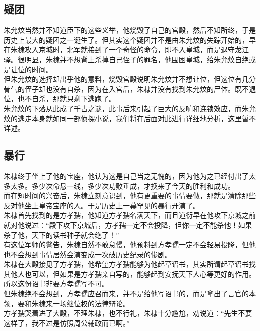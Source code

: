 \begin{multicols}{\theparacolNo}
\subsection{疑团}
朱允炆当然并不知道臣下的这些义举，他烧毁了自己的宫殿，然后不知所终，于是历史上最大的疑团之一诞生了。但其实这个疑团并不是由朱允炆的失踪开始的，早在朱棣攻入京城时，北军就接到了一个奇怪的命令，即不入皇城，而是退守龙江驿。很明显，朱棣并不想背上杀掉自己侄子的罪名，他围困皇城，给朱允炆自绝或是让位的时间。\\

但朱允炆的选择却出乎他的意料，烧毁宫殿说明朱允炆并不想让位，但这位有几分骨气的侄子却也没有自杀，因为在入宫后，朱棣并没有找到朱允炆的尸体。既不退位，也不自杀，那就只剩下逃跑了。\\

朱允炆的下落从此成了千古之谜，此事后来引起了巨大的反响和连锁效应，而朱允炆的逃走本身就如同一部侦探小说，我们将在后面对此进行详细地分析，这里暂不详述。\\

\subsection{暴行}
朱棣终于坐上了他的宝座，他认为这是自己当之无愧的，因为他为之已经付出了太多太多。多少次命悬一线，多少次功败垂成，才换来了今天的胜利和成功。\\

而在短时间的兴奋后，朱棣立刻意识到，他有更重要的事情要做，那就是清除那些反对他坐上皇帝宝座的人。于是历史上一幕罕见的暴行开演了。\\

朱棣首先找到的是方孝孺，他知道方孝孺名满天下，而且道衍早在他攻下京城之前就对他说过：“殿下攻下京城后，方孝孺一定不会投降，但你一定不能杀他！如果杀了他，天下的读书种子就会绝了！”\\

有这位军师的警告，朱棣自然不敢怠慢，他预料到方孝孺一定不会轻易投降，但他也不会想到事情居然会演变成一次破历史纪录的惨剧。\\

朱棣在大殿接见了方孝孺，他希望方孝孺能够为他起草诏书，其实所谓起草诏书找其他人也可以，但如果是方孝孺亲自写的，能够起到安抚天下人心等更好的作用。所以这份诏书非要方孝孺写不可。\\

但朱棣绝不会想到，方孝孺应召而来，并不是给他写诏书的，而是拿出了言官的本领，要和朱棣来一场继位权的法律辩论。\\

方孝孺哭着进了大殿，不理朱棣，也不行礼，朱棣十分尴尬，劝说道：“先生不要这样了，我不过是仿照周公辅政而已啊。”\\


\end{multicols}
